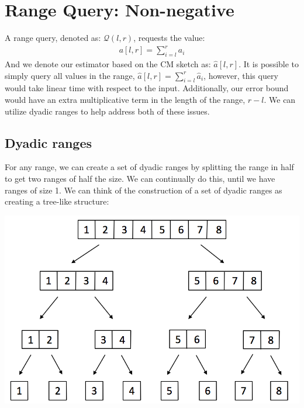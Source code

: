\documentclass[11pt]{article}
\begin{document}
{\section{Range Query: Non-negative}
A range query, denoted as: $\mathcal{Q}(l,r)$, requests the value:
\begin{align*}
    a[l,r] = \sum_{i=l}^r a_i
\end{align*}
And we denote our estimator based on the CM sketch as: $\hat a[l,r]$. It is
possible to simply query all values in the range, $\hat a[l,r] = \sum_{i=l}^r
\hat a_i$, however, this query would take linear time with respect to the input.
Additionally, our error bound would have an extra multiplicative term in the
length of the range, $r - l$. We can utilize dyadic ranges to help address both
of these issues.
\subsection{Dyadic ranges}
For any range, we can create a set of dyadic ranges by splitting the range in
half to get two ranges of half the size. We can continually do this, until we
have ranges of size 1. We can think of the construction of a set of dyadic
ranges as creating a tree-like structure:
\begin{center}\includegraphics[scale=0.3]{dyadic_ranges.png}\end{center}
}
\end{document}
